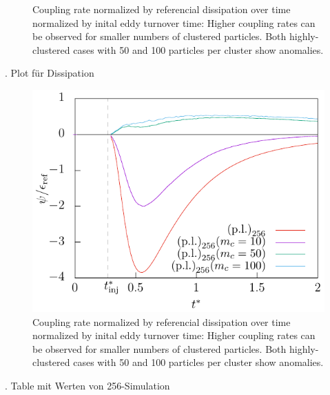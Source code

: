 \documentclass[11pt,a4paper,openany,oneside,parskip=half*]{article}
\begin{document}
\begin{figure}[h]
\begin{minipage}{0.5\textwidth}
        \caption{Coupling rate normalized by referencial dissipation over time normalized by inital eddy turnover time: Higher coupling rates can be observed for smaller numbers of clustered particles. Both highly-clustered cases with 50 and 100 particles per cluster show anomalies.}
        \label{coupling_time_128}
    \end{minipage}
\end{figure}
. Plot für Dissipation
\newline
\begin{figure}[h]
    \centering
    \begin{minipage}{.5\textwidth}
        
    \end{minipage}%
    \begin{minipage}{0.5\textwidth}
        \centering
        \includegraphics[width=\linewidth]{./Abbildungen/256/coupling_time.pdf}
        \caption{Coupling rate normalized by referencial dissipation over time normalized by inital eddy turnover time: Higher coupling rates can be observed for smaller numbers of clustered particles. Both highly-clustered cases with 50 and 100 particles per cluster show anomalies.}
        \label{coupling_time_128}
    \end{minipage}
\end{figure}
. Table mit Werten von 256-Simulation
\newline
\end{document}
